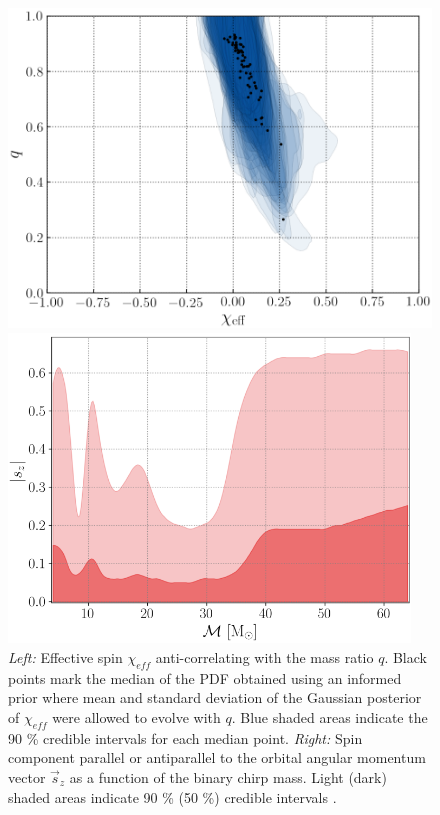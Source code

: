 \documentclass[a4paper,titlepage]{book}     	%
\begin{document}
\begin{figure}[h!]
	\begin{minipage}{.49\textwidth}
		\centering
		\includegraphics[width=\textwidth]{./images/spinmassratio.png}
	\end{minipage}
	\hfill
	\begin{minipage}{.49\textwidth}
		\centering
		\includegraphics[width=0.95\textwidth]{./images/spinchirpmass.png}	
	\end{minipage}
	\caption{\emph{Left:} Effective spin $\chi_{eff}$ anti-correlating with the mass ratio $q$. Black points mark the median of the PDF obtained using an informed prior where mean and standard deviation of the Gaussian posterior of $\chi_{eff}$ were allowed to evolve with $q$. Blue shaded areas indicate the 90 \% credible intervals for each median point. \emph{Right:} Spin component parallel or antiparallel to the orbital angular momentum vector $\vec{s}_z$ as a function of the binary chirp mass. Light (dark) shaded areas indicate 90 \% (50 \%) credible intervals \cite{GWTC-3_interpretation}.}\label{fig:spincorrelations}
\end{figure}
\end{document}
